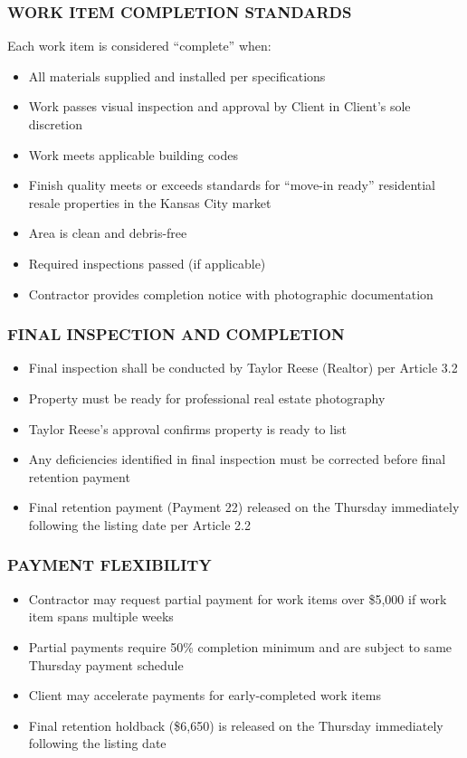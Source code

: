 \documentclass[10pt,letterpaper]{article}
\begin{document}
\subsubsection{WORK ITEM COMPLETION STANDARDS}
Each work item is considered ``complete'' when:
\begin{itemize}[leftmargin=*]
\item All materials supplied and installed per specifications
\item Work passes visual inspection and approval by Client in Client's sole discretion
\item Work meets applicable building codes
\item Finish quality meets or exceeds standards for ``move-in ready'' residential resale properties in the Kansas City market
\item Area is clean and debris-free
\item Required inspections passed (if applicable)
\item Contractor provides completion notice with photographic documentation
\end{itemize}

\subsubsection{FINAL INSPECTION AND COMPLETION}
\begin{itemize}[leftmargin=*]
\item Final inspection shall be conducted by Taylor Reese (Realtor) per Article 3.2
\item Property must be ready for professional real estate photography
\item Taylor Reese's approval confirms property is ready to list
\item Any deficiencies identified in final inspection must be corrected before final retention payment
\item Final retention payment (Payment 22) released on the Thursday immediately following the listing date per Article 2.2
\end{itemize}

\subsubsection{PAYMENT FLEXIBILITY}
\begin{itemize}[leftmargin=*]
\item Contractor may request partial payment for work items over \$5,000 if work item spans multiple weeks
\item Partial payments require 50\% completion minimum and are subject to same Thursday payment schedule
\item Client may accelerate payments for early-completed work items
\item Final retention holdback (\$6,650) is released on the Thursday immediately following the listing date
\end{itemize}
\end{document}
